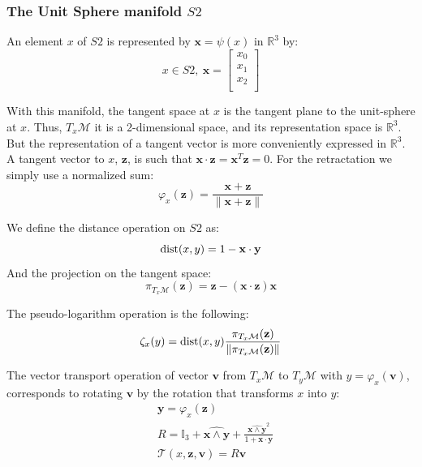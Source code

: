 \subsubsection{The Unit Sphere manifold $S2$}
\label{ssub:The Unit Sphere manifold S2}

An element $x$ of $S2$ is represented by $\mathbf{x}=\psi(x)$ in $\mathbb{R}^{3}$ by:
\begin{equation}
  x\in S2,\ \mathbf{x} =\begin{bmatrix}
    x_0\\
    x_1\\
    x_2\\
  \end{bmatrix}
\end{equation}

With this manifold, the tangent space at $x$ is the tangent plane to the unit-sphere at $x$.
Thus, $T_x\mathcal{M}$ it is a 2-dimensional space, and its representation space is $\mathbb{R}^3$.
But the representation of a tangent vector is more conveniently expressed in $\mathbb{R}^3$.
A tangent vector to $x$, $\mathbf{z}$, is such that $\mathbf{x}\cdot \mathbf{z} = \mathbf{x}^T\mathbf{z}=0$.
For the retractation we simply use a normalized sum:
\begin{equation}
  \varphi_x(\mathbf{z}) = \frac{\mathbf{x}+\mathbf{z}}{\|\mathbf{x}+\mathbf{z}\|}
\end{equation}

We define the distance operation on $S2$ as:
\begin{equation}
  \operatorname{dist}(x, y) = 1-\mathbf{x}\cdot \mathbf{y}
\end{equation}
And the projection on the tangent space:
\begin{equation}
  \pi_{T_x\mathcal{M}}(\mathbf{z}) = \mathbf{z} - (\mathbf{x} \cdot \mathbf{z}) \mathbf{x}
\end{equation}

The pseudo-logarithm operation is the following:
\begin{equation}
  \zeta_x(y) = \operatorname{dist}(x,y)\frac{\pi_{T_x\mathcal{M}}(\mathbf{z})}{\|\pi_{T_x\mathcal{M}}(\mathbf{z})\|}
\end{equation}

The vector transport operation of vector $\mathbf{v}$ from $T_x\mathcal{M}$ to $T_y\mathcal{M}$ with $y = \varphi_x(\mathbf{v})$, corresponds to rotating $\mathbf{v}$ by the rotation that transforms $x$ into $y$:
\begin{align}
  &\mathbf{y} = \varphi_x(\mathbf{z}) \\
  &R = \mathbb{I}_3 + \widehat{\mathbf{x} \wedge \mathbf{y}} + \frac{{\widehat{\mathbf{x} \wedge \mathbf{y}}}^2}{1+\mathbf{x}\cdot\mathbf{y}} \\
  &\mathcal{T}(x,\mathbf{z}, \mathbf{v}) = R\mathbf{v}
\end{align}


